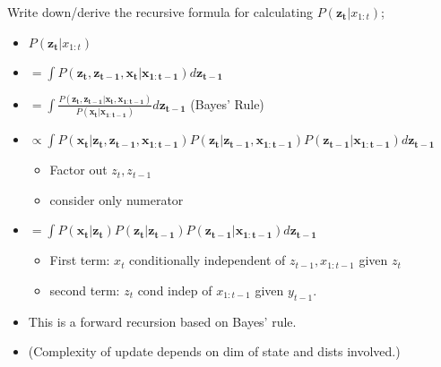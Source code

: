 \documentclass{article}
\begin{document}
Write down/derive the recursive formula for calculating $P(\mathbf{z_t}|x_{1:t})$; \begin{itemize} \item $P(\mathbf{z_t}|x_{1:t})$ \item $=\int P(\mathbf{z_t, z_{t-1}, x_t |x_{1:t-1}})d\mathbf{z_{t-1}}$ \item $=\int \frac{P(\mathbf{z_t, z_{t-1}|x_t, x_{1:t-1}})}{P(\mathbf{x_t|x_{1:t-1}})}d\mathbf{z_{t-1}}$ (Bayes' Rule) \item $\propto\int P(\mathbf{x_t| z_t, z_{t-1}, x_{1:t-1}})P(\mathbf{z_t|z_{t-1}, x_{1:t-1}}) P(\mathbf{z_{t-1}|x_{1:t-1}}) d\mathbf{z_{t-1}}$ \begin{itemize} \item Factor out $z_t, z_{t-1}$ \item consider only numerator \end{itemize} \item $=\int P(\mathbf{x_t| z_t})P(\mathbf{z_t|z_{t-1}}) P(\mathbf{z_{t-1}|x_{1:t-1}}) d\mathbf{z_{t-1}}$ \begin{itemize} \item First term: $x_t$ conditionally independent of $z_{t-1}, x_{1:t-1}$ given $z_t$ \item second term: $z_t$ cond indep of $x_{1:t-1}$ given $y_{t-1}$. \end{itemize} \item This is a forward recursion based on Bayes' rule.  \item (Complexity of update depends on dim of state and dists involved.) \end{itemize}
\end{document}
